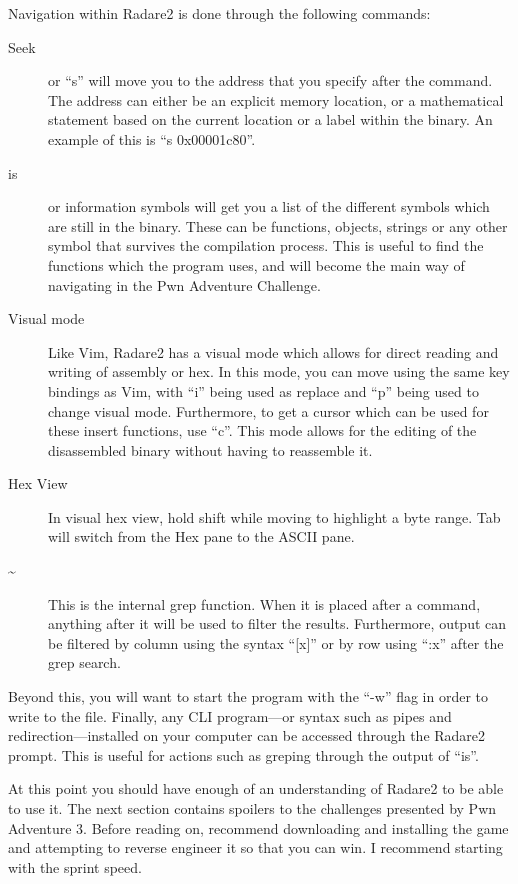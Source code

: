 \documentclass[a4paper,11pt]{report}
\begin{document}
			Navigation within Radare2 is done through the following commands:
			\begin{description}
				\item[Seek]
					or ``s'' will move you to the address that you specify after the command. 
					The address can either be an explicit memory location, or a mathematical statement based on the current location or a label within the binary. 
					An example of this is ``s 0x00001c80''.
				\item[is]
					or information symbols will get you a list of the different symbols which are still in the binary. 
					These can be functions, objects, strings or any other symbol that survives the compilation process. 
					This is useful to find the functions which the program uses, and will become the main way of navigating in the Pwn Adventure Challenge. 
				\item[Visual mode]
					Like Vim, Radare2 has a visual mode which allows for direct reading and writing of assembly or hex. 
					In this mode, you can move using the same key bindings as Vim, with ``i'' being used as replace and ``p'' being used to change visual mode. 
					Furthermore, to get a cursor which can be used for these insert functions, use ``c''.
					This mode allows for the editing of the disassembled binary without having to reassemble it. 
				\item[Hex View]
					In visual hex view, hold shift while moving to highlight a byte range. 
					Tab will switch from the Hex pane to the ASCII pane. 
				\item[\~{}]
					This is the internal grep function. 
					When it is placed after a command, anything after it will be used to filter the results. 
					Furthermore, output can be filtered by column using the syntax ``[x]'' or by row using ``:x'' after the grep search.
			\end{description}
			Beyond this, you will want to start the program with the ``-w'' flag in order to write to the file. 
			Finally, any CLI program---or syntax such as pipes and redirection---installed on your computer can be accessed through the Radare2 prompt. 
			This is useful for actions such as greping through the output of ``is''. 

			At this point you should have enough of an understanding of Radare2 to be able to use it. 
			The next section contains spoilers to the challenges presented by Pwn Adventure 3. 
			Before reading on, recommend downloading and installing the game and attempting to reverse engineer it so that you can win. 
			I recommend starting with the sprint speed. 
\end{document}
